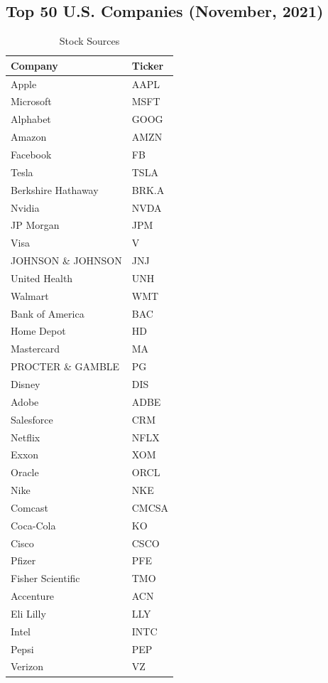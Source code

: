 \documentclass[conference]{IEEEtran}
\begin{document}
\begin{singlespace}
\begin{Center}
\subsection{Top 50 U.S. Companies (November, 2021)}
\label{top50}
\begin{table}[H]
    \caption{Stock Sources}
    \centering
\begin{tabular}{|l|l|}
    \hline
    \textbf{Company} & \textbf{Ticker} \\
    \hline
    Apple & AAPL \\
    Microsoft & MSFT \\
    Alphabet & GOOG \\
    Amazon & AMZN \\
    Facebook & FB \\
    Tesla & TSLA \\
    Berkshire Hathaway & BRK.A \\
    Nvidia & NVDA \\
    JP Morgan & JPM \\
    Visa & V \\
    JOHNSON \& JOHNSON & JNJ \\
    United Health & UNH \\
    Walmart & WMT \\
    Bank of America & BAC \\
    Home Depot & HD \\
    Mastercard & MA \\
    PROCTER \& GAMBLE & PG \\
    Disney & DIS \\
    Adobe & ADBE \\
    Salesforce & CRM \\
    Netflix & NFLX \\
    Exxon & XOM \\
    Oracle & ORCL \\
    Nike & NKE \\
    Comcast & CMCSA \\
    Coca-Cola & KO \\
    Cisco & CSCO \\
    Pfizer & PFE \\
    Fisher Scientific & TMO \\
    Accenture & ACN \\
    Eli Lilly & LLY \\
    Intel & INTC \\
    Pepsi & PEP \\
    Verizon & VZ \\

\end{tabular}
\end{table}
\end{Center}
\end{singlespace}
\end{document}
